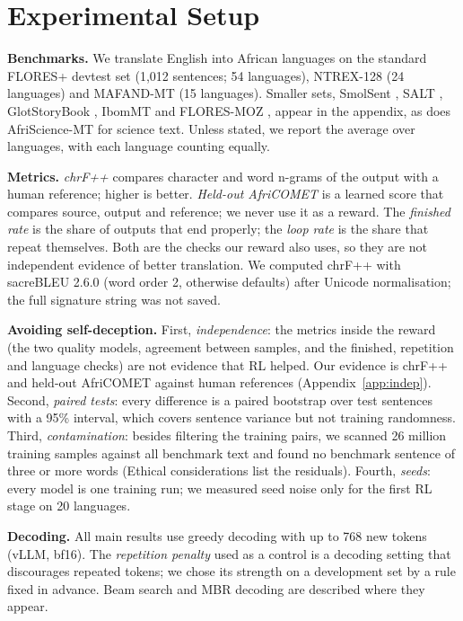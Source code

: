 \section{Experimental Setup}\label{sec:eval}
\textbf{Benchmarks.} We translate English into African languages on the standard FLORES+ devtest set \citep{oldi2025floresplus} (1,012 sentences; 54 languages), NTREX-128 \citep{federmann2022ntrex} (24 languages) and MAFAND-MT \citep{adelani2022mafand} (15 languages). Smaller sets, SmolSent \citep{caswell2025smol}, SALT \citep{akera2022salt}, GlotStoryBook \citep{kargaran2023glotlid}, IbomMT \citep{kalejaiye2025ibom} and FLORES-MOZ \citep{moznlp2026floresmoz}, appear in the appendix, as does AfriScience-MT \citep{abdulmumin2026afriscience} for science text. Unless stated, we report the average over languages, with each language counting equally.

\textbf{Metrics.} \emph{chrF++} compares character and word n-grams of the output with a human reference; higher is better. \emph{Held-out AfriCOMET} is a learned score that compares source, output and reference; we never use it as a reward. The \emph{finished rate} is the share of outputs that end properly; the \emph{loop rate} is the share that repeat themselves. Both are the checks our reward also uses, so they are not independent evidence of better translation. We computed chrF++ with sacreBLEU 2.6.0 (word order 2, otherwise defaults) after Unicode normalisation; the full signature string was not saved.

\textbf{Avoiding self-deception.} First, \emph{independence}: the metrics inside the reward (the two quality models, agreement between samples, and the finished, repetition and language checks) are not evidence that RL helped. Our evidence is chrF++ and held-out AfriCOMET against human references (Appendix~\ref{app:indep}). Second, \emph{paired tests}: every difference is a paired bootstrap over test sentences with a 95\% interval, which covers sentence variance but not training randomness. Third, \emph{contamination}: besides filtering the training pairs, we scanned 26 million training samples against all benchmark text and found no benchmark sentence of three or more words (Ethical considerations list the residuals). Fourth, \emph{seeds}: every model is one training run; we measured seed noise only for the first RL stage on 20 languages.

\textbf{Decoding.} All main results use greedy decoding with up to 768 new tokens (vLLM, bf16). The \emph{repetition penalty} used as a control is a decoding setting that discourages repeated tokens; we chose its strength on a development set by a rule fixed in advance. Beam search and MBR decoding are described where they appear.
